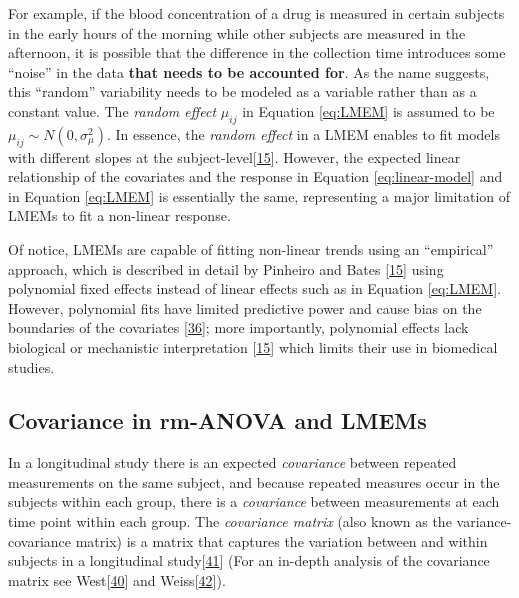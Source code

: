 \documentclass[
]{article}
\begin{document}
For example, if the blood concentration of a drug is measured in certain subjects in the early hours of the morning while other subjects are measured in the afternoon, it is possible that the difference in the collection time introduces some ``noise'' in the data \textbf{that needs to be accounted for}. As the name suggests, this ``random'' variability needs to be modeled as a variable rather than as a constant value. The \emph{random effect} \(\mu_{ij}\) in Equation \eqref{eq:LMEM} is assumed to be \(\mu_{ij} \sim N(0,\sigma^2_\mu)\). In essence, the \emph{random effect} in a LMEM enables to fit models with different slopes at the subject-level{[}\protect\hyperlink{ref-pinheiro2006}{15}{]}. However, the expected linear relationship of the covariates and the response in Equation \eqref{eq:linear-model} and in Equation \eqref{eq:LMEM} is essentially the same, representing a major limitation of LMEMs to fit a non-linear response.

Of notice, LMEMs are capable of fitting non-linear trends using an ``empirical'' approach, which is described in detail by Pinheiro and Bates {[}\protect\hyperlink{ref-pinheiro2006}{15}{]} using polynomial fixed effects instead of linear effects such as in Equation \eqref{eq:LMEM}. However, polynomial fits have limited predictive power and cause bias on the boundaries of the covariates {[}\protect\hyperlink{ref-beck1998}{36}{]}; more importantly, polynomial effects lack biological or mechanistic interpretation {[}\protect\hyperlink{ref-pinheiro2006}{15}{]} which limits their use in biomedical studies.

\hypertarget{covariance-in-rm-anova-and-lmems}{%
\subsection{Covariance in rm-ANOVA and LMEMs}\label{covariance-in-rm-anova-and-lmems}}

In a longitudinal study there is an expected \emph{covariance} between repeated measurements on the same subject, and because repeated measures occur in the subjects within each group, there is a \emph{covariance} between measurements at each time point within each group. The \emph{covariance matrix} (also known as the variance-covariance matrix) is a matrix that captures the variation between and within subjects in a longitudinal study{[}\protect\hyperlink{ref-wolfinger1996}{41}{]} (For an in-depth analysis of the covariance matrix see West{[}\protect\hyperlink{ref-west2014}{40}{]} and Weiss{[}\protect\hyperlink{ref-weiss2005}{42}{]}).
\end{document}

